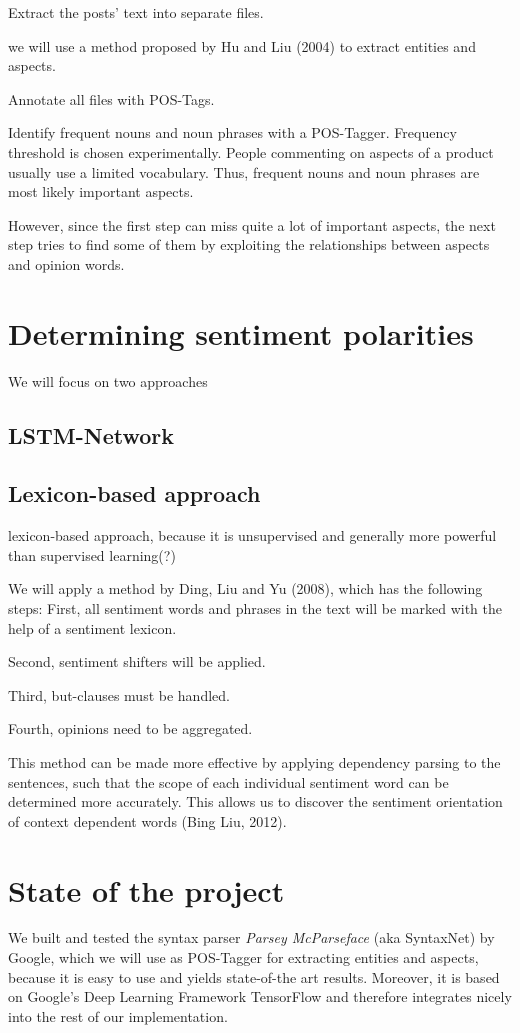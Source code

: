 \documentclass[10pt,a4paper]{article}
\begin{document}
	Extract the posts' text into separate files.
	
	we will use a method proposed by Hu and Liu (2004) to extract entities and aspects.
	
	Annotate all files with POS-Tags.
	
	Identify frequent nouns and noun phrases with a POS-Tagger. Frequency threshold is chosen experimentally. People commenting on aspects of a product usually use a limited vocabulary. Thus, frequent nouns and noun phrases are most likely important aspects.
	
	However, since the first step can miss quite a lot of important aspects, the next step tries to find some of them by exploiting the relationships between aspects and opinion words.
	
	\section{Determining sentiment polarities}
	We will focus on two approaches
	
		\subsection{LSTM-Network}
		
		\subsection{Lexicon-based approach}
		lexicon-based approach, because it is unsupervised and generally more powerful than supervised learning(?)
		
		We will apply a method by Ding, Liu and Yu (2008), which has the following steps: First, all sentiment words and phrases in the text will be marked with the help of a sentiment lexicon.
		
		Second, sentiment shifters will be applied.
		
		Third, but-clauses must be handled.
		
		Fourth, opinions need to be aggregated.
	
		This method can be made more effective by applying dependency parsing to the sentences, such that the scope of each individual sentiment word can be determined more accurately. This allows us to discover the sentiment orientation of context dependent words (Bing Liu, 2012).

	\section{State of the project}
	We built and tested the syntax parser \textit{Parsey McParseface} (aka SyntaxNet) by Google, which we will use as POS-Tagger for extracting entities and aspects, because it is easy to use and yields state-of-the art results. Moreover, it is based on Google's Deep Learning Framework TensorFlow and therefore integrates nicely into the rest of our implementation.
	
\end{document}

